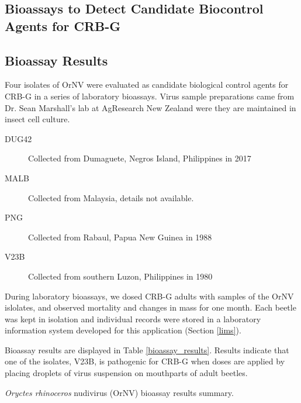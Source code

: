 \documentclass[12pt,letterpaper,english,bibliography=totocnumbered]{scrartcl}
\begin{document}
\begin{refsection}
\section{Bioassays to Detect Candidate Biocontrol Agents for CRB-G}

\subsection{Bioassay Results}

Four isolates of OrNV were evaluated as candidate biological control agents for CRB-G in a series of laboratory bioassays. Virus sample preparations came from Dr. Sean Marshall's lab at AgResearch New Zealand were they are maintained in insect cell culture.

\begin{description}
	\item[DUG42] Collected from Dumaguete, Negros Island, Philippines in 2017
	\item[MALB] Collected from Malaysia, details not available.
	\item[PNG] Collected from Rabaul, Papua New Guinea in 1988
	\item[V23B] Collected from southern Luzon, Philippines in 1980
\end{description}

During laboratory bioassays, we dosed CRB-G adults with samples of the OrNV islolates, and observed mortality and changes in mass for one month. Each beetle was kept in isolation and individual records were stored in a laboratory information system developed for this application (Section \ref{lims}).

Bioassay results are displayed in Table \ref{bioassay_results}. Results indicate that one of the isolates, V23B, is pathogenic for CRB-G when doses are applied by placing droplets of virus suspension on mouthparts of adult beetles.

\begin{table}[h]
		\begin{adjustbox}{width=\columnwidth,center}
			
	 	\begin{threeparttable} 
	\caption{\textit{Oryctes rhinoceros} nudivirus (OrNV) bioassay results summary.}
	\label{bioassay_results}
	 		

\end{threeparttable}
\end{adjustbox}
\end{table}
\end{refsection}
\end{document}

